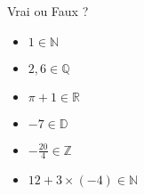 \documentclass{automatisme}
\begin{document}
\begin{frame}
	Vrai ou Faux ?

	\begin{multicols}{2}
		\begin{itemize}\setlength\itemsep{1.5em}
			\item $1 ∈ ℕ$
			\item $2,6 ∈ ℚ$
			\item $π + 1 ∈ ℝ$
			\item $-7 ∈ 𝔻$
			\item $-\frac{20}{4} ∈ ℤ$
			\item $12 + 3 × (-4) ∈ ℕ$
		\end{itemize}
	\end{multicols}
\end{frame}
\end{document}
